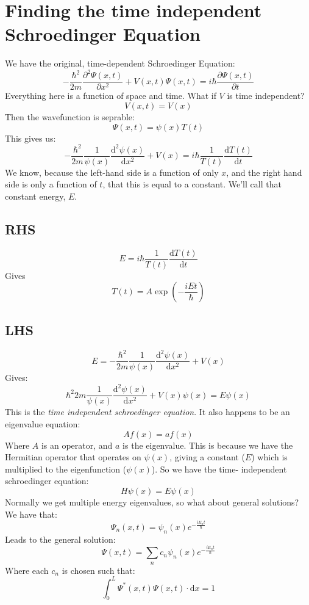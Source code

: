 \section{Finding the time independent Schroedinger Equation}
We have the original, time-dependent Schroedinger Equation:
$$
	-\frac{\hbar^2}{2m}\frac{\partial^2 \Psi(x,t)}{\partial x^2} +
	V(x,t)\Psi(x,t) = i\hbar \frac{\partial \Psi(x,t)}{\partial t}
$$
Everything here is a function of space and time. What if $V$ is time
independent?
$$
	V(x,t) = V(x)
$$
Then the wavefunction is seprable:
$$
	\Psi(x,t) = \psi(x)T(t)
$$
This gives us:
$$
	-\frac{\hbar^2}{2m} \frac{1}{\psi(x)}
	\frac{\mathrm{d}^2\psi(x)}{\mathrm{d}x^2}
	+ V(x) = i\hbar \frac{1}{T(t)} \frac{\mathrm{d} T(t)}{\mathrm{d}t}
$$
We know, because the left-hand side is a function of only $x$, and the right
hand side is only a function of $t$, that this is equal to a constant. We'll
call that constant energy, $E$.

\subsection{RHS}
$$
	E = i \hbar \frac{1}{T(t)} \frac{\mathrm{d} T(t)}{\mathrm{d}t}
$$
Gives
$$
	T(t) = A\exp\left(-\frac{iEt}{\hbar}\right)
$$
\subsection{LHS}
$$
	E = -\frac{\hbar^2}{2m} \frac{1}{\psi(x)}
	\frac{\mathrm{d}^2\psi(x)}{\mathrm{d}x^2}  + V(x)
$$
Gives:
$$
	{\hbar^2}{2m} \frac{1}{\psi(x)}
    \frac{\mathrm{d}^2\psi(x)}{\mathrm{d}x^2} + V(x) \psi(x) = E\psi(x)
$$
This is the \emph{time independent schroedinger equation}. It also happens to be
an eigenvalue equation:
$$
	A f(x) = a f(x)
$$
Where $A$ is an operator, and $a$ is the eigenvalue. This is because we have the
Hermitian operator that operates on $\psi(x)$, giving a constant ($E$)
which is multiplied to the eigenfunction ($\psi(x)$). So we have the time-
independent schroedinger equation:
$$
	H\psi(x) = E\psi(x)
$$
Normally we get multiple energy eigenvalues, so what about general solutions? We
have that:
$$
	\Psi_n(x,t) = \psi_n(x) e^{-\frac{iE_n t}{\hbar}}
$$
Leads to the general solution:
$$
	\Psi(x,t) = \sum_n c_n \psi_n(x) e^{-\frac{iE_n t}{\hbar}}
$$
Where each $c_n$ is chosen such that:
$$
	\int^L_0 \Psi^*(x,t) \Psi(x,t) \cdot \mathrm{d}x = 1
$$

